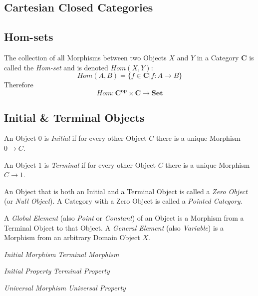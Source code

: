\documentclass{article}
\begin{document}
\subsection{Cartesian Closed Categories}\label{subsec:cartesian_category}

\subsection{Hom-sets}\label{subsec:hom_set}

The collection of all Morphisms between two Objects $X$ and $Y$ in a
Category $\mathbf{C}$ is called the \emph{Hom-set} and is denoted
$Hom(X,Y)$:
\[
    Hom(A,B) = \{f \in \mathbf{C} | f : A \rightarrow B\}
\]
Therefore
\[
    Hom : \mathbf{C^{op}} \times \mathbf{C} \rightarrow \mathbf{Set}
\]

\subsection{Initial \& Terminal Objects}\label{subsec:initial_terminal}

An Object $0$ is \emph{Initial} if for every other Object $C$ there is
a unique Morphism $0 \rightarrow C$.

An Object $1$ is \emph{Terminal} if for every other Object $C$ there
is a unique Morphism $C \rightarrow 1$.

An Object that is both an Initial and a Terminal Object is called a
\emph{Zero Object} (or \emph{Null Object}). A Category with a Zero
Object is called a \emph{Pointed Category}.

A \emph{Global Element} (also \emph{Point} or \emph{Constant}) of an
Object is a Morphism from a Terminal Object to that Object. A
\emph{General Element} (also \emph{Variable}) is a Morphism from an
arbitrary Domain Object $X$.

\emph{Initial Morphism} \emph{Terminal Morphism}

\emph{Initial Property} \emph{Terminal Property}

\emph{Universal Morphism} \emph{Universal Property}

\end{document}
